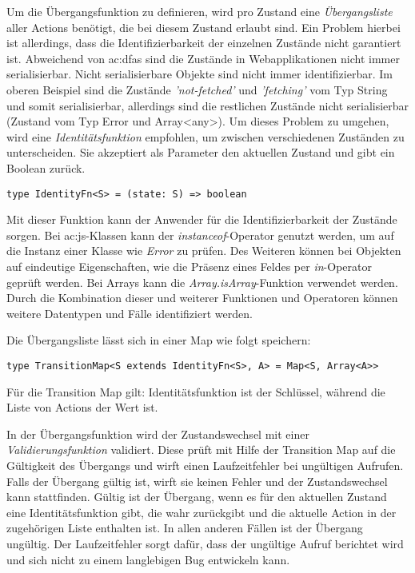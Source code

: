 Um die Übergangsfunktion zu definieren, wird pro Zustand eine \textit{Übergangsliste} aller Actions benötigt, die bei diesem Zustand erlaubt sind. Ein Problem hierbei ist allerdings, dass die Identifizierbarkeit der einzelnen Zustände nicht garantiert ist. Abweichend von \acrlong{ac:dfa}s sind die Zustände in Webapplikationen nicht immer serialisierbar. Nicht serialisierbare Objekte sind nicht immer identifizierbar. Im oberen Beispiel sind die Zustände \textit{'not-fetched'} und \textit{'fetching'} vom Typ String und somit serialisierbar, allerdings sind die restlichen Zustände nicht serialisierbar (Zustand vom Typ Error und Array<any>). Um dieses Problem zu umgehen, wird eine \textit{Identitätsfunktion} empfohlen, um zwischen verschiedenen Zuständen zu unterscheiden. Sie akzeptiert als Parameter den aktuellen Zustand und gibt ein Boolean zurück.

\begin{lstlisting}
type IdentityFn<S> = (state: S) => boolean
\end{lstlisting}


Mit dieser Funktion kann der Anwender für die Identifizierbarkeit der Zustände sorgen. Bei \acrlong{ac:js}-Klassen kann der \textit{instanceof}-Operator genutzt werden, um auf die Instanz einer Klasse wie \textit{Error} zu prüfen.\cite{jsInstanceofOperator} Des Weiteren können bei Objekten auf eindeutige Eigenschaften, wie die Präsenz eines Feldes per \textit{in}-Operator geprüft werden.\cite{jsInOperator} Bei Arrays kann die \textit{Array.isArray}-Funktion verwendet werden.\cite{jsIsArray} Durch die Kombination dieser und weiterer Funktionen und Operatoren können weitere Datentypen und Fälle identifiziert werden.

Die Übergangsliste lässt sich in einer Map wie folgt speichern:

\begin{lstlisting}
type TransitionMap<S extends IdentityFn<S>, A> = Map<S, Array<A>>
\end{lstlisting}

Für die Transition Map gilt: Identitätsfunktion ist der Schlüssel, während die Liste von Actions der Wert ist.

In der Übergangsfunktion wird der Zustandswechsel mit einer \textit{Validierungsfunktion} validiert. Diese prüft mit Hilfe der Transition Map auf die Gültigkeit des Übergangs und wirft einen Laufzeitfehler bei ungültigen Aufrufen. Falls der Übergang gültig ist, wirft sie keinen Fehler und der Zustandswechsel kann stattfinden. Gültig ist der Übergang, wenn es für den aktuellen Zustand eine Identitätsfunktion gibt, die wahr zurückgibt und die aktuelle Action in der zugehörigen Liste enthalten ist. In allen anderen Fällen ist der Übergang ungültig. Der Laufzeitfehler sorgt dafür, dass der ungültige Aufruf berichtet wird und sich nicht zu einem langlebigen Bug entwickeln kann.

